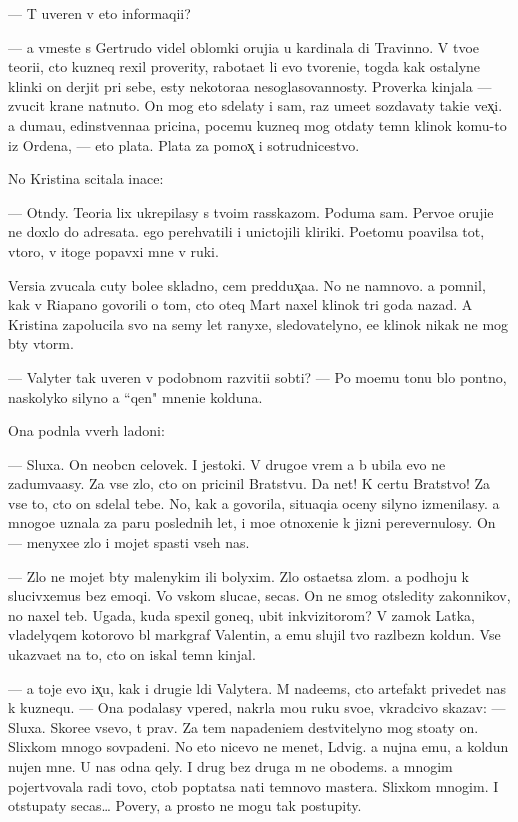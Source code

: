 \documentclass[10pt]{book}
\begin{document}
— T{\yi} uveren v eto{\y} informaqi{\y}i?

— {\Y}a vmeste s Gertrudo{\y} videl oblomki oruji{\y}a u kardinala di Travinno. V tvo{\y}e{\y} teori{\y}i, cto kuzneq rexil proverity, rabota{\y}et li {\y}evo tvoreni{\y}e, togda kak ostalyn{\yi}{\y}e klinki on derjit pri sebe, {\y}esty nekotora{\y}a nesoglasovannosty. Proverka kinjala — zvucit kra{\y}ne nat{\ia}nuto. On mog eto sdelaty i sam, raz ume{\y}et sozdavaty taki{\y}e vex̨i. {\Y}a duma{\y}u, {\y}edinstvenna{\y}a pricina, pocemu kuzneq mog otdaty temn{\yi}{\y} klinok komu-to iz Ordena, — eto plata. Plata za pomox̨ i sotrudnicestvo.

No Kristina scitala inace:

— Otn{\iu}dy. Teori{\y}a lix ukrepilasy s tvo{\y}im rasskazom. Poduma{\y} sam. Pervo{\y}e oruji{\y}e ne doxlo do adresata. {\Y}ego perehvatili i unictojili kliriki. Poetomu po{\y}avilsa tot, vtoro{\y}, v itoge popavxi{\y} mne v ruki.

Versi{\y}a zvucala cuty bole{\y}e skladno, cem pred{\yi}dux̨a{\y}a. No ne namnovo. {\Y}a pomnil, kak v Riapano govorili o tom, cto oteq Mart naxel klinok tri goda nazad. A Kristina zapolucila svo{\y} na semy let ranyxe, sledovatelyno, {\y}e{\y}e klinok nikak ne mog b{\yi}ty vtor{\yi}m.

— Valyter tak uveren v podobnom razviti{\y}i sob{\yi}ti{\y}? — Po mo{\y}emu tonu b{\yi}lo pon{\ia}tno, naskolyko silyno {\y}a ``qen{\iu}" mneni{\y}e kolduna.

Ona podn{\ia}la vverh ladoni:

— Sluxa{\y}. On neob{\yi}cn{\yi}{\y} celovek. I jestoki{\y}. V drugo{\y}e vrem{\ia} {\y}a b{\yi} ubila {\y}evo ne zadum{\yi}va{\y}asy. Za vse zlo, cto on pricinil Bratstvu. Da net! K certu Bratstvo! Za vse to, cto on sdelal tebe. No, kak {\y}a govorila, situaqi{\y}a oceny silyno izmenilasy. {\Y}a mnogo{\y}e uznala za paru poslednih let, i mo{\y}e otnoxeni{\y}e k jizni perevernulosy. On — menyxe{\y}e zlo i mojet spasti vseh nas.

— Zlo ne mojet b{\yi}ty malenykim ili bolyxim. Zlo osta{\y}etsa zlom. {\Y}a podhoju k slucivxemus{\ia} bez emoqi{\y}. Vo vs{\ia}kom sluca{\y}e, se{\y}cas. On ne smog otsledity zakonnikov, no naxel teb{\ia}. Ugada{\y}, kuda spexil goneq, ubit{\yi}{\y} inkvizitorom? V zamok Latka, vladelyqem kotorovo b{\yi}l markgraf Valentin, a {\y}emu slujil tvo{\y} razl{\iu}bezn{\yi}{\y} koldun. Vse ukaz{\yi}va{\y}et na to, cto on iskal temn{\yi}{\y} kinjal.

— {\Y}a toje {\y}evo ix̨u, kak i drugi{\y}e l{\iu}di Valytera. M{\yi} nade{\y}ems{\ia}, cto artefakt privedet nas k kuznequ. — Ona podalasy vpered, nakr{\yi}la mo{\y}u ruku svo{\y}e{\y}, vkradcivo skazav: — Sluxa{\y}. Skore{\y}e vsevo, t{\yi} prav. Za tem napadeni{\y}em de{\y}stvitelyno mog sto{\y}aty on. Slixkom mnogo sovpadeni{\y}. No eto nicevo ne men{\ia}{\y}et, L{\iu}dvig. {\Y}a nujna {\y}emu, a koldun nujen mne. U nas odna qely. I drug bez druga m{\yi} ne obo{\y}dems{\ia}. {\Y}a mnogim pojertvovala radi tovo, ctob{\yi} pop{\yi}tatsa na{\y}ti temnovo mastera. Slixkom mnogim. I otstupaty se{\y}cas… Povery, {\y}a prosto ne mogu tak postupity.
\end{document}
